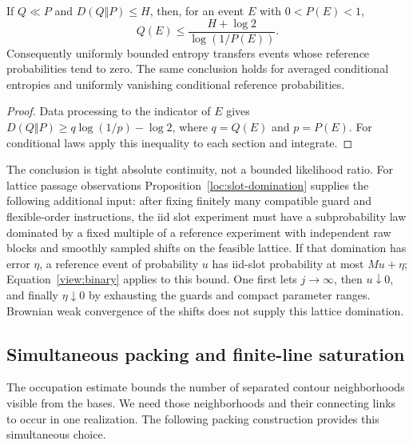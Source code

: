 \begin{lemma}\label{view:entropy-null}
If $Q\ll P$ and $D(Q\Vert P)\le H$, then, for an event $E$ with
$0<P(E)<1$,
\begin{equation}\label{view:binary}
 Q(E)\le\frac{H+\log2}{\log(1/P(E))}.
\end{equation}
Consequently uniformly bounded entropy transfers events whose reference
probabilities tend to zero.  The same conclusion holds for averaged
conditional entropies and uniformly vanishing conditional reference
probabilities.
\end{lemma}

\begin{proof}
Data processing to the indicator of $E$ gives
$D(Q\Vert P)\ge q\log(1/p)-\log2$, where $q=Q(E)$ and $p=P(E)$.
For conditional laws apply this inequality to each section and integrate.
\end{proof}

The conclusion is tight absolute continuity, not a bounded likelihood ratio.
For lattice passage observations Proposition~\ref{loc:slot-domination}
supplies the following additional input: after
fixing finitely many compatible guard and flexible-order instructions, the
iid slot experiment must have a subprobability law dominated by a fixed
multiple of a reference experiment with independent raw blocks and smoothly
sampled shifts on the feasible lattice.  If that domination has error
$\eta$, a reference event of probability $u$ has iid-slot probability at most
$Mu+\eta$; Equation~\eqref{view:binary} applies to this bound.  One first lets
$j\to\infty$, then $u\downarrow0$, and finally $\eta\downarrow0$ by exhausting
the guards and compact parameter ranges.  Brownian weak convergence of the
shifts does not supply this lattice domination.

\subsection{Simultaneous packing and finite-line saturation}

The occupation estimate bounds the number of separated contour
neighborhoods visible from the bases.  We need those neighborhoods and
their connecting links to occur in one realization.  The following
packing construction provides this simultaneous choice.

